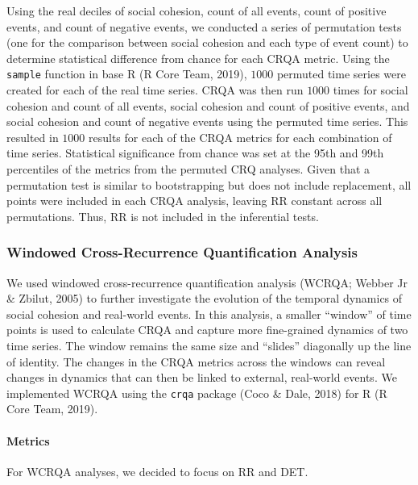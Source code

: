 \documentclass[
  english,
  man]{apa6}
\let\oldparagraph\paragraph
\renewcommand{\paragraph}[1]{\oldparagraph{#1}\mbox{}}
\begin{document}
Using the real deciles of social cohesion, count of all events, count of
positive events, and count of negative events, we conducted a series of
permutation tests (one for the comparison between social cohesion and each type
of event count) to determine statistical difference from chance for each CRQA
metric. Using the \texttt{sample} function in base R (R Core Team, 2019), \(1000\) permuted time
series were created for each of the real time series. CRQA was then run \(1000\)
times for social cohesion and count of all events, social cohesion and count of
positive events, and social cohesion and count of negative events using the
permuted time series. This resulted in \(1000\) results for each of the CRQA
metrics for each combination of time series. Statistical significance from
chance was set at the 95th and 99th percentiles of the metrics from the permuted
CRQ analyses. Given that a permutation test is similar to bootstrapping but does
not include replacement, all points were included in each CRQA analysis, leaving
RR constant across all permutations. Thus, RR is not included in the inferential
tests.

\hypertarget{windowed-cross-recurrence-quantification-analysis}{%
\subsubsection{Windowed Cross-Recurrence Quantification Analysis}\label{windowed-cross-recurrence-quantification-analysis}}

We used windowed cross-recurrence quantification analysis (WCRQA; Webber Jr \& Zbilut, 2005) to further investigate the evolution of the temporal
dynamics of social cohesion and real-world events. In this analysis, a smaller
\enquote{window} of time points is used to calculate CRQA and capture more fine-grained
dynamics of two time series. The window remains the same size and \enquote{slides}
diagonally up the line of identity. The changes in the CRQA metrics across the
windows can reveal changes in dynamics that can then be linked to external,
real-world events. We implemented WCRQA using the \texttt{crqa} package (Coco \& Dale, 2018) for R
(R Core Team, 2019).

\hypertarget{metrics-1}{%
\paragraph{Metrics}\label{metrics-1}}

For WCRQA analyses, we decided to focus on RR and DET.
\end{document}
